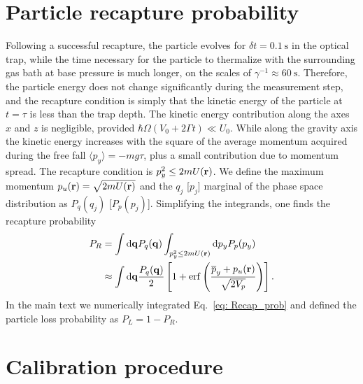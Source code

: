 \documentclass[aps,amssymb,amsmath,prb,superscriptaddress,reprint,notitlepage,onecolumn]{revtex4-1}
\newcommand{\<}{\langle}
\renewcommand{\>}{\rangle}
\begin{document}
\section{Particle recapture probability}\label{app: model}

Following a successful recapture, the particle evolves for $\delta t = 0.1~\mathrm{s}$ in the optical trap, while the time necessary for the particle to thermalize with the surrounding gas bath at base pressure is much longer, on the scales of $\gamma^{-1}\approx 60~\mathrm{s}$.
%
Therefore, the particle energy does not change significantly during the measurement step, and the recapture condition is simply that the kinetic energy of the particle at $t=\tau$ is less than the trap depth.
%
The kinetic energy contribution along the axes $x$ and $z$ is negligible, provided $\hbar\Omega(V_0+2\Gamma t)\ll U_0 $.
%
While along the gravity axis the kinetic energy increases with the square of the average momentum acquired during the free fall $\langle p_y \rangle =-m g \tau$, plus a small contribution due to  momentum spread.
%
The recapture condition is $p_y^2\leq 2mU(\vb{r})$.
%
We define the maximum momentum $p_u(\vb{r})=\sqrt{2mU(\vb{r})}$ and the $q_j$ [$p_j$] marginal of the phase space distribution as $P_{q}(q_j)$ [$P_{p}(p_j)$].
%
Simplifying the integrands, one finds the recapture probability
%
\begin{equation}\label{eq: Recap_prob}
	\begin{aligned}
		P_R&=\int \dd\vb{q} P_q (\vb{q})\int_{p_y^2\leq 2mU(\vb{r})} \dd p_y P_p(p_y)\\
		&\approx\int \dd\vb{q} \frac{P_q (\vb{q}) }{2}\left[1+\erf\left(\frac{\overline{p}_y+ p_{u}(\vb{r})}{\sqrt{2 V_p}} \right)\right]
        .
	\end{aligned}
\end{equation}
%
In the main text we numerically integrated Eq.~\ref{eq: Recap_prob} and defined the particle loss probability as $P_L=1-P_R$.


\section{Calibration procedure}\label{app:calibration}
\end{document}
